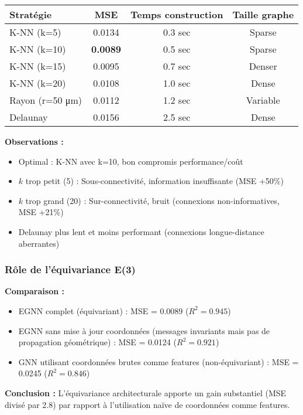 \begin{center}
\begin{tabular}{|l|c|c|c|}
\hline
\textbf{Stratégie} & \textbf{MSE} & \textbf{Temps construction} & \textbf{Taille graphe} \\
\hline
K-NN (k=5) & 0.0134 & 0.3 sec & Sparse \\
K-NN (k=10) & \textbf{0.0089} & 0.5 sec & Sparse \\
K-NN (k=15) & 0.0095 & 0.7 sec & Denser \\
K-NN (k=20) & 0.0108 & 1.0 sec & Dense \\
Rayon (r=50 μm) & 0.0112 & 1.2 sec & Variable \\
Delaunay & 0.0156 & 2.5 sec & Dense \\
\hline
\end{tabular}
\end{center}

\textbf{Observations :}
\begin{itemize}
    \item Optimal : K-NN avec k=10, bon compromis performance/coût
    \item $k$ trop petit (5) : Sous-connectivité, information insuffisante (MSE +50\%)
    \item $k$ trop grand (20) : Sur-connectivité, bruit (connexions non-informatives, MSE +21\%)
    \item Delaunay plus lent et moins performant (connexions longue-distance aberrantes)
\end{itemize}

\subsubsection{Rôle de l'équivariance E(3)}

\textbf{Comparaison :}
\begin{itemize}
    \item EGNN complet (équivariant) : MSE = 0.0089 ($R^2 = 0.945$)
    \item EGNN sans mise à jour coordonnées (messages invariants mais pas de propagation géométrique) : MSE = 0.0124 ($R^2 = 0.921$)
    \item GNN utilisant coordonnées brutes comme features (non-équivariant) : MSE = 0.0245 ($R^2 = 0.846$)
\end{itemize}

\textbf{Conclusion :}
L'équivariance architecturale apporte un gain substantiel (MSE divisé par 2.8) par rapport à l'utilisation naïve de coordonnées comme features.

